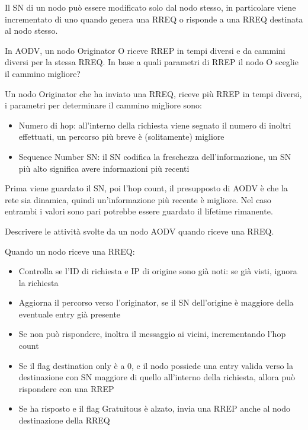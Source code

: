 \begin{questions}
\begin{solution}
        Il SN di un nodo può essere modificato solo dal nodo stesso, in particolare viene incrementato di uno quando genera una RREQ o risponde a una RREQ destinata al nodo stesso.
    \end{solution}
    
    \question In AODV, un nodo Originator O riceve RREP in tempi diversi e da cammini diversi per la stessa RREQ. In base a quali parametri di RREP il nodo O sceglie il cammino migliore?
    
    \begin{solution}
        Un nodo Originator che ha inviato una RREQ, riceve più RREP in tempi diversi, i parametri per determinare il cammino migliore sono: 
        \begin{itemize}
            \item Numero di hop: all'interno della richiesta viene segnato il numero di inoltri effettuati, un percorso più breve è (solitamente) migliore
            
            \item Sequence Number SN: il SN codifica la freschezza dell'informazione, un SN più alto significa avere informazioni più recenti
        \end{itemize}
        
        Prima viene guardato il SN, poi l'hop count, il presupposto di AODV è che la rete sia dinamica, quindi un'informazione più recente è migliore. Nel caso entrambi i valori sono pari potrebbe essere guardato il lifetime rimanente.
    \end{solution}
    
    \question Descrivere le attività svolte da un nodo AODV quando riceve una RREQ.
    
    \begin{solution}
        Quando un nodo riceve una RREQ:
        \begin{itemize}
            \item Controlla se l'ID di richiesta e IP di origine sono già noti: se già visti, ignora la richiesta
            
            \item Aggiorna il percorso verso l'originator, se il SN dell'origine è maggiore della eventuale entry già presente
            
            \item Se non può rispondere, inoltra il messaggio ai vicini, incrementando l'hop count
            
            \item Se il flag destination only è a 0, e il nodo possiede una entry valida verso la destinazione con SN maggiore di quello all'interno della richiesta, allora può rispondere con una RREP
            
            \item Se ha risposto e il flag Gratuitous è alzato, invia una RREP anche al nodo destinazione della RREQ
        \end{itemize}
    \end{solution}
\end{questions}